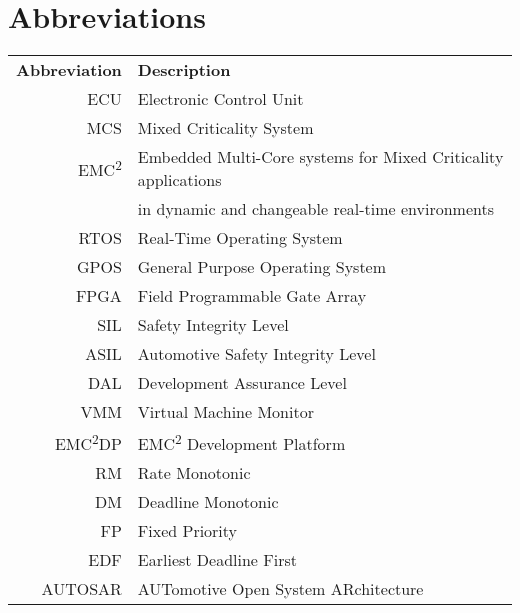 \chapter*{Abbreviations}
\begin{tabular}{r l}
\textbf{Abbreviation} 	& \textbf{Description} \vspace{.5em} \\
ECU		&Electronic Control Unit\\
MCS		&Mixed Criticality System\\
EMC\textsuperscript{2}	&Embedded Multi-Core systems for Mixed Criticality applications\\
 		&in dynamic and changeable real-time environments\\
RTOS	&Real-Time Operating System\\
GPOS	&General Purpose Operating System\\
FPGA	&Field Programmable Gate Array\\
SIL		&Safety Integrity Level\\
ASIL	&Automotive Safety Integrity Level\\
DAL		&Development Assurance Level\\
VMM		&Virtual Machine Monitor\\
EMC\textsuperscript{2}DP	&EMC\textsuperscript{2} Development Platform\\
RM		&Rate Monotonic\\
DM		&Deadline Monotonic\\
FP		&Fixed Priority\\
EDF		&Earliest Deadline First\\
AUTOSAR	&AUTomotive Open System ARchitecture\\

\end{tabular}